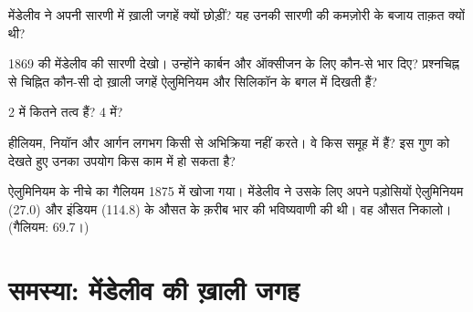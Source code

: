 \begin{exercise}[$\star\star$]\label{exo:g9:periodic-table-first-look:8}
मेंडेलीव ने अपनी सारणी में ख़ाली जगहें क्यों छोड़ीं? यह उनकी सारणी की कमज़ोरी के
बजाय ताक़त क्यों थी?
\end{exercise}

\begin{exercise}[$\star\star$]\label{exo:g9:periodic-table-first-look:9}
1869 की मेंडेलीव की सारणी देखो। उन्होंने कार्बन और ऑक्सीजन के लिए कौन-से 
भार दिए? प्रश्नचिह्न से चिह्नित कौन-सी दो ख़ाली जगहें ऐलुमिनियम और सिलिकॉन के
बगल में दिखती हैं?
\end{exercise}

\begin{exercise}[$\star\star$]\label{exo:g9:periodic-table-first-look:10}
 2 में कितने तत्व हैं?  4 में?
\end{exercise}

\begin{exercise}[$\star\star\star$]\label{exo:g9:periodic-table-first-look:11}
हीलियम, नियॉन और आर्गन लगभग किसी से अभिक्रिया नहीं करते। वे किस समूह में
हैं? इस गुण को देखते हुए उनका उपयोग किस काम में हो सकता है?
\end{exercise}

\begin{exercise}[$\star\star\star$]\label{exo:g9:periodic-table-first-look:12}
ऐलुमिनियम के नीचे का गैलियम 1875 में खोजा गया। मेंडेलीव ने उसके लिए अपने पड़ोसियों
ऐलुमिनियम (27.0) और इंडियम (114.8) के औसत के क़रीब  भार की भविष्यवाणी
की थी। वह औसत निकालो। (गैलियम: 69.7।)
\end{exercise}

\section{समस्या: मेंडेलीव की ख़ाली जगह}

